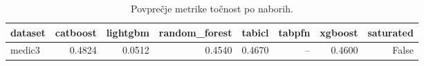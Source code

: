 \begin{table}[htbp]
\centering
\caption{Povprečje metrike točnost po naborih.}
\label{tab:pivot}
\begin{tabular}{lrrrrrrr}
\hline
dataset & catboost & lightgbm & random\_forest & tabicl & tabpfn & xgboost & saturated \\
\hline
medic3 & 0.4824 & 0.0512 & 0.4540 & 0.4670 & -- & 0.4600 & False \\
\hline
\end{tabular}
\end{table}
